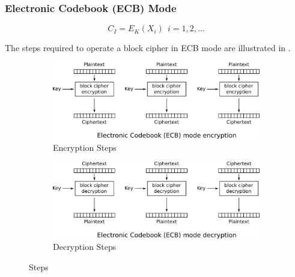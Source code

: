 \subsubsection{Electronic Codebook (ECB) Mode}\label{subsubsec:Electronic_Codebook_Mode}
\begin{equation}\label{eq:Electronic_Codebook_Mode_Encryption}
  C_{I} = E_{K}(X_{i}) \:\: i=1, 2, \ldots
\end{equation}

The steps required to operate a block cipher in ECB mode are illustrated in .
\begin{figure}[ht!]
  \centering
  \begin{subfigure}[h!]{0.45\linewidth}
    \centering
    \includegraphics[scale=0.55]{./Drawings/EDIN01-Cryptography/ECB_Mode-Encryption.png}
    \caption{ Encryption Steps}
    \label{subfig:ECB_Mode_Steps_Encryption}
  \end{subfigure}
  \vline{}
  \begin{subfigure}[h!]{0.45\linewidth}
    \centering
    \includegraphics[scale=0.55]{./Drawings/EDIN01-Cryptography/ECB_Mode-Decryption.png}
    \caption{ Decryption Steps}
    \label{subfig:ECB_Mode_Steps_Decryption}
  \end{subfigure}
  \caption{ Steps}
  \label{fig:Electronic_Codebook_Mode_Steps}
\end{figure}

